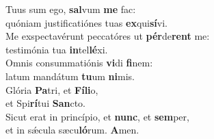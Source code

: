 \evenverse Tuus sum ego, \textbf{sal}vum \textbf{me} fac:~\*\\
\evenverse quóniam justificatiónes tuas \textbf{ex}qui\textbf{sí}vi.\\
\oddverse Me exspectavérunt peccatóres ut \textbf{pér}de\textbf{rent} me:~\*\\
\oddverse testimónia tua \textbf{in}tel\textbf{lé}xi.\\
\evenverse Omnis consummatiónis \textbf{vi}di \textbf{fi}nem:~\*\\
\evenverse latum mandátum \textbf{tu}um \textbf{ni}mis.\\
\oddverse Glória \textbf{Pa}tri, et \textbf{Fí}\textbf{li}o,~\*\\
\oddverse et Spi\textbf{rí}tui \textbf{San}cto.\\
\evenverse Sicut erat in princípio, et \textbf{nunc}, et \textbf{sem}per,~\*\\
\evenverse et in sǽcula sæcu\textbf{ló}rum. \textbf{A}men.\\
